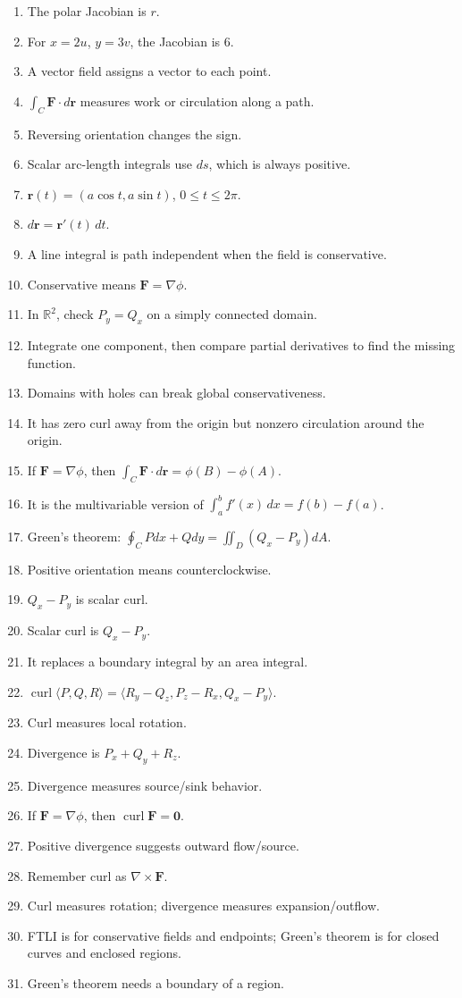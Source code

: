 \documentclass[11pt]{article}
\newcommand{\R}{\mathbb{R}}
\newcommand{\curl}{\operatorname{curl}}
\begin{document}
\begin{enumerate}
\item The polar Jacobian is $r$.
\item For $x=2u$, $y=3v$, the Jacobian is $6$.
\item A vector field assigns a vector to each point.
\item $\int_C\mathbf F\cdot d\mathbf r$ measures work or circulation along a path.
\item Reversing orientation changes the sign.
\item Scalar arc-length integrals use $ds$, which is always positive.
\item $\mathbf r(t)=(a\cos t,a\sin t)$, $0\le t\le2\pi$.
\item $d\mathbf r=\mathbf r'(t)\,dt$.
\item A line integral is path independent when the field is conservative.
\item Conservative means $\mathbf F=\nabla\phi$.
\item In $\R^2$, check $P_y=Q_x$ on a simply connected domain.
\item Integrate one component, then compare partial derivatives to find the missing function.
\item Domains with holes can break global conservativeness.
\item It has zero curl away from the origin but nonzero circulation around the origin.
\item If $\mathbf F=\nabla\phi$, then $\int_C\mathbf F\cdot d\mathbf r=\phi(B)-\phi(A)$.
\item It is the multivariable version of $\int_a^b f'(x)\,dx=f(b)-f(a)$.
\item Green's theorem: $\oint_C Pdx+Qdy=\iint_D(Q_x-P_y)dA$.
\item Positive orientation means counterclockwise.
\item $Q_x-P_y$ is scalar curl.
\item Scalar curl is $Q_x-P_y$.
\item It replaces a boundary integral by an area integral.
\item $\curl\langle P,Q,R\rangle=\langle R_y-Q_z,P_z-R_x,Q_x-P_y\rangle$.
\item Curl measures local rotation.
\item Divergence is $P_x+Q_y+R_z$.
\item Divergence measures source/sink behavior.
\item If $\mathbf F=\nabla\phi$, then $\curl\mathbf F=\mathbf0$.
\item Positive divergence suggests outward flow/source.
\item Remember curl as $\nabla\times\mathbf F$.
\item Curl measures rotation; divergence measures expansion/outflow.
\item FTLI is for conservative fields and endpoints; Green's theorem is for closed curves and enclosed regions.
\item Green's theorem needs a boundary of a region.
\end{enumerate}
\end{document}
